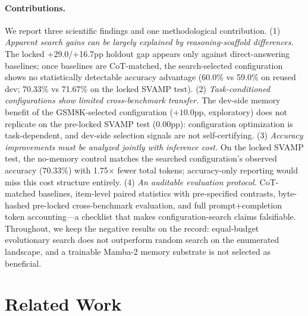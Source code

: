 \documentclass[11pt]{article}
\begin{document}
\paragraph{Contributions.} We report three scientific findings and one
methodological contribution.
(1) \emph{Apparent search gains can be largely explained by
reasoning-scaffold differences.} The locked +29.0/+16.7pp holdout gap
appears only against direct-answering baselines; once baselines are
CoT-matched, the search-selected configuration shows no statistically
detectable accuracy advantage (60.0\% vs 59.0\% on reused dev; 70.33\% vs
71.67\% on the locked SVAMP test).
(2) \emph{Task-conditioned configurations show limited cross-benchmark
transfer.} The dev-side memory benefit of the GSM8K-selected configuration
($+10.0$pp, exploratory) does not replicate on the pre-locked SVAMP test
($0.00$pp): configuration optimization is task-dependent, and dev-side
selection signals are not self-certifying.
(3) \emph{Accuracy improvements must be analyzed jointly with inference
cost.} On the locked SVAMP test, the no-memory control matches the searched
configuration's observed accuracy (70.33\%) with 1.75$\times$ fewer total
tokens; accuracy-only reporting would miss this cost structure entirely.
(4) \emph{An auditable evaluation protocol.} CoT-matched baselines,
item-level paired statistics with pre-specified contrasts, byte-hashed
pre-locked cross-benchmark evaluation, and full prompt+completion token
accounting---a checklist that makes configuration-search claims
falsifiable. Throughout, we keep the negative results on the record:
equal-budget evolutionary search does not outperform random search on the
enumerated landscape, and a trainable Mamba-2 memory substrate is not
selected as beneficial.

\section{Related Work}
\end{document}
